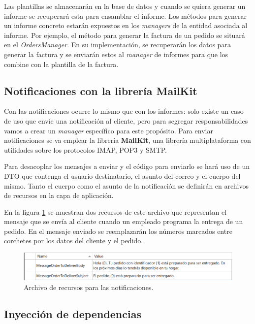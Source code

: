 \documentclass[11pt,spanish,listoffigures]{tfgetsinf}
\begin{document}
Las plantillas se almacenarán en la base de datos y cuando se quiera generar un informe se recuperará esta para ensamblar el informe. Los métodos para generar un informe concreto estarán expuestos en los \textit{managers} de la entidad asociada al informe. Por ejemplo, el método para generar la factura de un pedido se situará en el \textit{OrdersManager}. En su implementación, se recuperarán los datos para generar la factura y se enviarán estos al \textit{manager} de informes para que los combine con la plantilla de la factura.

\subsection{Notificaciones con la librería MailKit}

Con las notificaciones ocurre lo mismo que con los informes: solo existe un caso de uso que envíe una notificación al cliente, pero para segregar responsabilidades vamos a crear un \textit{manager} específico para este propósito. Para enviar notificaciones se va emplear la librería \textbf{MailKit}, una librería multiplataforma con utilidades sobre los protocolos IMAP, POP3 y SMTP.

Para desacoplar los mensajes a enviar y el código para enviarlo se hará uso de un DTO que contenga el usuario destinatario, el asunto del correo y el cuerpo del mismo. Tanto el cuerpo como el asunto de la notificación se definirán en archivos de recursos en la capa de aplicación. 

En la figura \ref{fig:NotificationsMessage} se muestran dos recursos de este archivo que representan el mensaje que se envía al cliente cuando un empleado programa la entrega de un pedido. En el mensaje enviado se reemplazarán los números marcados entre corchetes por los datos del cliente y el pedido.

\begin{figure}[h]
\centering
\includegraphics[scale=1]{NotificationsMessage}
\caption{Archivo de recursos para las notificaciones.}
\label{fig:NotificationsMessage}
\end{figure}

\subsection{Inyección de dependencias}
\end{document}
